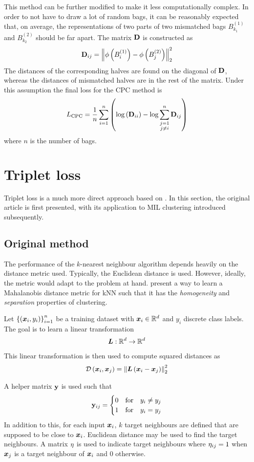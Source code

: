 This method can be further modified to make it less computationally complex. In order to not have to draw a lot of random bags, it can be reasonably expected that, on average, the representations of two parts of two mismatched bags \( B_{k_1}^{(1)} \) and \( B_{k_2}^{(2)} \) should be far apart. The matrix \( \mathbf{D} \) is constructed as
\[ \mathbf{D}_{ij} = \left\lVert \phi \left( B_i^{(1)} \right) - \phi \left( B_j^{(2)} \right) \right\rVert_2^2 \]
The distances of the corresponding halves are found on the diagonal of \( \mathbf{D} \), whereas the distances of mismatched halves are in the rest of the matrix. Under this assumption the final loss for the CPC method is
\[ L_\mathrm{CPC} = \frac{1}{n} \sum_{i = 1}^n \left( \log \left( \mathbf{D}_{ii} \right) - \log \sum_{\substack{j = 1 \\ j \neq i}}^n \mathbf{D}_{ij} \right) \]
where \( n \) is the number of bags.

\section{Triplet loss}
Triplet loss is a much more direct approach based on \cite{weinberger_distance_2006}. In this section, the original article is first presented, with its application to MIL clustering introduced subsequently.

\subsection{Original method}
The performance of the \( k \)-nearest neighbour algorithm depends heavily on the distance metric used. Typically, the Euclidean distance is used. However, ideally, the metric would adapt to the problem at hand. \cite{weinberger_distance_2006} present a way to learn a Mahalanobis distance metric for kNN such that it has the \textit{homogeneity} and \textit{separation} properties of clustering.

Let \( \left\{ \left( \bm{x}_i, y_i \right) \right\}_{i = 1}^n \) be a training dataset with \( \bm{x}_i \in \mathbb{R}^d \) and \( y_i \) discrete class labels. The goal is to learn a linear transformation
\[ \bm{L} : \mathbb{R}^d \to \mathbb{R}^d \]
This linear transformation is then used to compute squared distances as
\[ \mathcal{D} \left( \bm{x}_i, \bm{x}_j \right) = \left\lVert \bm{L} \left( \bm{x}_i - \bm{x}_j \right) \right\rVert_2^2 \]

A helper matrix \( \mathbf{y} \) is used such that
\[ \mathbf{y}_{ij} = \begin{cases}
    0 &\text{for} \quad y_i \neq y_j \\
    1 &\text{for} \quad y_i = y_j \\
  \end{cases} \]
In addition to this, for each input \( \bm{x}_i \), \( k \) target neighbours are defined that are supposed to be close to \( \bm{x}_i \). Euclidean distance may be used to find the target neighbours. A matrix \( \mathbf{\eta} \) is used to indicate target neighbours where \( \mathbf{\eta}_{ij} = 1 \) when \( \bm{x}_j \) is a target neighbour of \( \bm{x}_i \) and \( 0 \) otherwise.

